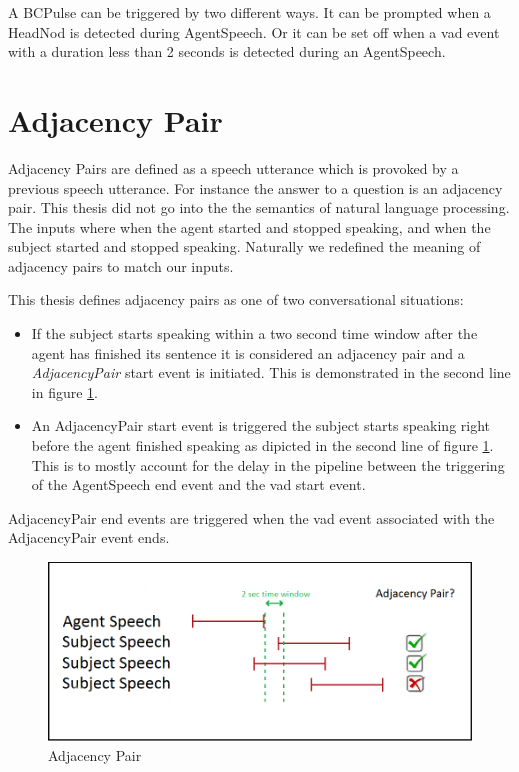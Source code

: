 \documentclass[12pt, a4paper, fleqn]{memoir}%
\begin{document}
A BCPulse can be triggered by two different ways. It can be prompted when a HeadNod is detected during AgentSpeech. Or it can be set off when a vad event with a duration less than 2 seconds is detected during an AgentSpeech.

\section{Adjacency Pair}
\label{sec:AdjacencyPair}
Adjacency Pairs are defined as a speech utterance which is provoked by a previous speech utterance. For instance the answer to a question is an adjacency pair. This thesis did not go into the the semantics of natural language processing. The inputs where when the agent started and stopped speaking, and when the subject started and stopped speaking. Naturally we redefined the meaning of adjacency pairs to match our inputs.

This thesis defines adjacency pairs as one of two conversational situations:

\begin{itemize}
  \item If the subject starts speaking within a two second time window after the agent has finished its sentence it is considered an adjacency pair and a \textit{AdjacencyPair} start event is initiated. This is demonstrated in the second line in figure \ref{fig:AdjPair_img}.
  \item An AdjacencyPair start event is triggered the subject starts speaking right before the agent finished speaking as dipicted in the second line of figure \ref{fig:AdjPair_img}. This is to mostly account for the delay in the pipeline between the triggering of the AgentSpeech end event and the vad start event.
\end{itemize}

AdjacencyPair end events are triggered when the vad event associated with the AdjacencyPair event ends.

\begin{figure}[h!]
    \centering
    \includegraphics[width=1\textwidth]{AP}
    \caption{Adjacency Pair}
    \label{fig:AdjPair_img}
\end{figure}
\end{document}
